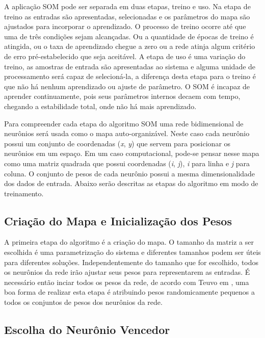 A aplicação SOM pode ser separada em duas etapas, treino e uso. Na etapa de treino as entradas são apresentadas, selecionadas e os parâmetros do mapa são ajustados para incorporar o aprendizado. O processo de treino ocorre até que uma de três condições sejam alcançadas. Ou a quantidade de épocas de treino é atingida, ou o taxa de aprendizado chegue a zero ou a rede atinja algum critério de erro pré-estabelecido que seja aceitável. A etapa de uso é uma variação do treino, as amostras de entrada são apresentadas ao sistema e alguma unidade de processamento será capaz de selecioná-la, a diferença desta etapa para o treino é que não há nenhum aprendizado ou ajuste de parâmetro. O SOM é incapaz de aprender continuamente, pois seus parâmetros internos decaem com tempo, chegando a estabilidade total, onde não há mais aprendizado.

Para compreender cada etapa do algoritmo SOM uma rede bidimensional de neurônios será usada como o mapa auto-organizável. Neste caso cada neurônio possui um conjunto de coordenadas (\textit{x}, \textit{y}) que servem para posicionar os neurônios em um espaço. Em um caso computacional, pode-se pensar nesse mapa como uma matriz quadrada que possui coordenadas (\textit{i}, \textit{j}), \textit{i} para linha e \textit{j} para coluna. O conjunto de pesos de cada neurônio possui a mesma dimensionalidade dos dados de entrada. Abaixo serão descritas as etapas do algoritmo em modo de treinamento.

\subsection{Criação do Mapa e Inicialização dos Pesos} 

A primeira etapa do algoritmo é a criação do mapa. O tamanho da matriz a ser escolhida é uma parametrização do sistema e diferentes tamanhos podem ser úteis para diferentes soluções. Independentemente do tamanho que for escolhido, todos os neurônios da rede irão ajustar seus pesos para representarem as entradas. É necessário então inciar todos os pesos da rede, de acordo com Teuvo em , uma boa forma de realizar esta etapa é atribuindo pesos randomicamente pequenos a todos os conjuntos de pesos dos neurônios da rede.

\subsection{Escolha do Neurônio Vencedor} 

